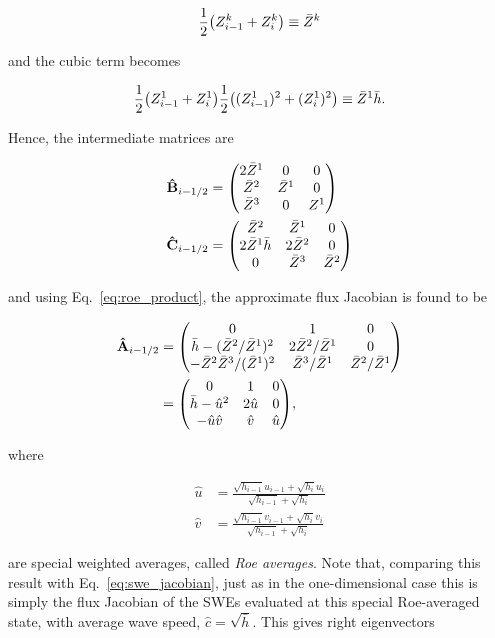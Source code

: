 \begin{align}
  \frac{1}{2}\qty(Z^k_{i-1} + Z^k_i) \equiv \bar Z^k
\end{align}

and the cubic term becomes

\begin{align}
  \frac{1}{2}\qty(Z^1_{i-1} + Z^1_i) \frac{1}{2} \qty((Z^1_{i-1})^2 + (Z^1_i)^2) \equiv \bar Z^1 \bar h.
\end{align}

Hence, the intermediate matrices are

\begin{align}
  \vu B_{i-1/2} &= \mqty(
    2\bar Z^1 & 0 & 0 \\
    \bar Z^2 & \bar Z^1 & 0 \\
    \bar Z^3 & 0 & Z^1
  ) \\
  \vu C_{i-1/2} &= \mqty(
    \bar Z^2 & \bar Z^1 & 0 \\
    2 \bar Z^1 \bar h & 2\bar Z^2 & 0 \\
    0 & \bar Z^3 & \bar Z^2
  )
\end{align}

and using Eq.~\ref{eq:roe_product}, the approximate flux Jacobian is found to be

\begin{align}
  \vu A_{i-1/2} &= \mqty(
    0 & 1 & 0 \\
    \bar h - (\bar Z^2 / \bar Z^1)^2 & 2 \bar Z^2 / \bar Z^1 & 0 \\
    - \bar Z^2 \bar Z^3 / (\bar Z^1)^2 & \bar Z^3 / \bar Z^1 & \bar Z^2 / \bar Z^1
  ) \\
  &= \mqty(
    0 & 1 & 0 \\
    \bar h - \hat u^2 & 2 \hat u & 0 \\
    -\hat u\hat v & \hat v & \hat u
  ),
\end{align}

where

\begin{align}
  \hat u &= \frac{\sqrt{h_{i-1}}u_{i-1}+\sqrt{h_i}u_i}{\sqrt{h_{i-1}}+\sqrt{h_i}} \\
  \hat v &= \frac{\sqrt{h_{i-1}}v_{i-1}+\sqrt{h_i}v_i}{\sqrt{h_{i-1}}+\sqrt{h_i}}
\end{align}

are special weighted averages, called \emph{Roe averages}. Note that, comparing this result with Eq.~\ref{eq:swe_jacobian}, just as in the one-dimensional case this is simply the flux Jacobian of the SWEs evaluated at this special Roe-averaged state, with average wave speed, $\hat c = \sqrt{\bar h}$. This gives right eigenvectors

